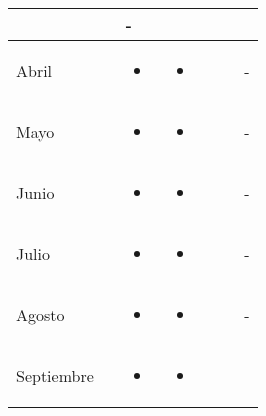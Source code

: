 \documentclass[landscape, a4paper, 10pt]{article}
\newcommand{\smallcellwidth}{0.7in}
\newcommand{\normalcellwidth}{1.2in}
\newcommand{\bigcellwidth}{2.0in}
\begin{document}
\begin{longtable}{|m{\smallcellwidth}|p{\normalcellwidth}|p{\bigcellwidth}|p{\bigcellwidth}|p{\normalcellwidth}|p{\normalcellwidth}|p{\normalcellwidth}|}
		  &
		  &
		 - \\
		\hline
		Abril &
		 &
		\begin{itemize}
			\item 
		\end{itemize} &
		\begin{itemize}
			\item 
		\end{itemize} &
		  &
		  &
		 - \\
		\hline
		Mayo &
		 &
		\begin{itemize}
			\item 
		\end{itemize} &
		\begin{itemize}
			\item 
		\end{itemize} &
		  &
		  &
		 - \\
		\hline
		Junio &
		 &
		\begin{itemize}
			\item 
		\end{itemize} &
		\begin{itemize}
			\item 
		\end{itemize} &
		  &
		  &
		 - \\
		\hline
		Julio &
		 &
		\begin{itemize}
			\item 
		\end{itemize} &
		\begin{itemize}
			\item 
		\end{itemize} &
		  &
		  &
		 - \\
		\hline
		Agosto &
		 &
		\begin{itemize}
			\item 
		\end{itemize} &
		\begin{itemize}
			\item 
		\end{itemize} &
		  &
		  &
		 - \\
		\hline
		Septiembre &
		 &
		\begin{itemize}
			\item 
		\end{itemize} &
		\begin{itemize}
			\item 
		\end{itemize} &

\end{longtable}
\end{document}
